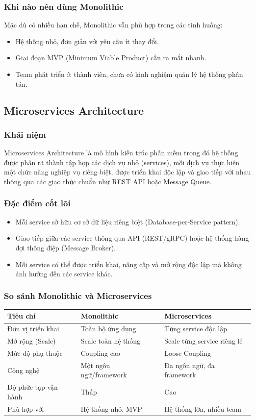 \documentclass[12pt,a4paper]{article}
\begin{document}
\subsubsection{Khi nào nên dùng Monolithic}
Mặc dù có nhiều hạn chế, Monolithic vẫn phù hợp trong các tình huống:
\begin{itemize}
  \item Hệ thống nhỏ, đơn giản với yêu cầu ít thay đổi.
  \item Giai đoạn MVP (Minimum Viable Product) cần ra mắt nhanh.
  \item Team phát triển ít thành viên, chưa có kinh nghiệm quản lý hệ thống phân tán.
\end{itemize}

\subsection{Microservices Architecture}
\subsubsection{Khái niệm}
Microservices Architecture là mô hình kiến trúc phần mềm trong đó hệ thống được phân rã thành
tập hợp các dịch vụ nhỏ (services), mỗi dịch vụ thực hiện một chức năng nghiệp vụ riêng biệt,
được triển khai độc lập và giao tiếp với nhau thông qua các giao thức chuẩn như REST API hoặc
Message Queue.

\subsubsection{Đặc điểm cốt lõi}
\begin{itemize}
  \item Mỗi service sở hữu cơ sở dữ liệu riêng biệt (Database-per-Service pattern).
  \item Giao tiếp giữa các service thông qua API (REST/gRPC) hoặc hệ thống hàng đợi thông điệp (Message Broker).
  \item Mỗi service có thể được triển khai, nâng cấp và mở rộng độc lập mà không ảnh hưởng đến các service khác.
\end{itemize}

\subsubsection{So sánh Monolithic và Microservices}
\begin{longtable}{p{3.8cm}p{5.2cm}p{5.2cm}}
\toprule
\textbf{Tiêu chí} & \textbf{Monolithic} & \textbf{Microservices} \\
\midrule
Đơn vị triển khai & Toàn bộ ứng dụng & Từng service độc lập \\
Mở rộng (Scale) & Scale toàn hệ thống & Scale từng service riêng lẻ \\
Mức độ phụ thuộc & Coupling cao & Loose Coupling \\
Công nghệ & Một ngôn ngữ/framework & Đa ngôn ngữ, đa framework \\
Độ phức tạp vận hành & Thấp & Cao \\
Phù hợp với & Hệ thống nhỏ, MVP & Hệ thống lớn, nhiều team \\
\bottomrule
\end{longtable}
\end{document}
